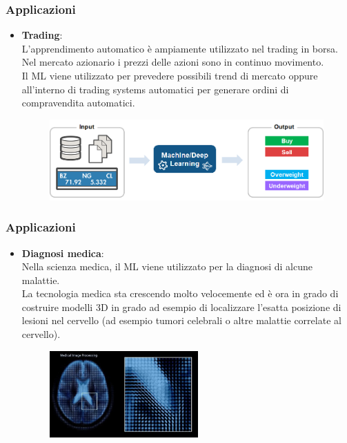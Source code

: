 \begin{frame}
	\frametitle{Applicazioni}
		\begin{itemize}
			\item \textbf{Trading}:\\
				L'apprendimento automatico è ampiamente utilizzato nel trading in borsa.\\
				Nel mercato azionario i prezzi delle azioni sono in continuo movimento.\\
				Il ML viene utilizzato per prevedere possibili trend di mercato oppure all'interno di trading systems automatici per generare ordini di compravendita automatici.
				\begin{figure}[!htbp]
					\centering
					\includegraphics[width=10.5cm]{images/intro/ml_in_trading.png}
				\end{figure}
		\end{itemize}		
\end{frame}


\begin{frame}
	\frametitle{Applicazioni}
		\begin{itemize}
			\item \textbf{Diagnosi medica}:\\
				Nella scienza medica, il ML viene utilizzato per la diagnosi di alcune malattie.\\
				La tecnologia medica sta crescendo molto velocemente ed è ora in grado di costruire modelli 3D in grado ad esempio di localizzare l'esatta posizione di lesioni nel cervello (ad esempio tumori celebrali o altre malattie correlate al cervello).
				\begin{figure}[!htbp]
					\centering
					\includegraphics[width=5.7cm]{images/intro/medical_image_processing.jpg}
				\end{figure}
		\end{itemize}		
\end{frame}


